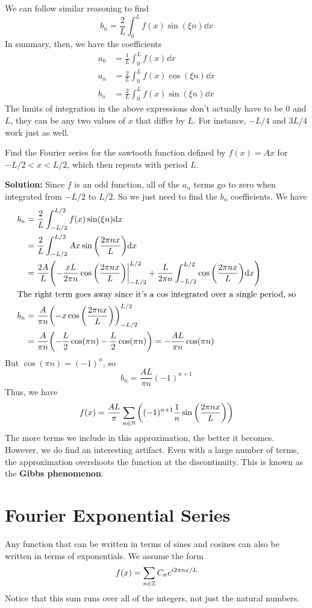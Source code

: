 We can follow similar reasoning to find
\[ b_n = \frac{2}{L}\int_0^L f(x)\sin(\xi n)\dd x\]
In summary, then, we have the coefficients
\begin{align*}
    a_0 &= \frac{1}{L}\int_0^L f(x)\dd x \\
    a_n &= \frac{2}{L}\int_0^L f(x)\cos(\xi n)\dd x \\
    b_n &= \frac{2}{L}\int_0^L f(x)\sin(\xi n)\dd x
\end{align*}
The limits of integration in the above expressions don't actually have to be $0$ and $L$, they can be any two values of $x$ that differ by $L$. For instance, $-L/4$ and $3L/4$ work just as well.  
\begin{example}
    Find the Fourier series for the sawtooth function defined by $f(x) = Ax$ for $-L/2 < x < L/2$, which then repeats with period $L$. 

    \textbf{Solution:} Since $f$ is an odd function, all of the $a_n$ terms go to zero when integrated from $-L/2$ to $L/2$. So we just need to find the $b_n$ coefficients. We have
    \begin{align*}
        b_n &= \frac{2}{L}\int_{-L/2}^{L/2} f(x)\sin(\xi n)\dd x \\
        &= \frac{2}{L}\int_{-L/2}^{L/2} Ax\sin\pqty{\frac{2\pi nx}{L}}\dd x \\
        &= \frac{2A}{L}\pqty{-\frac{xL}{2\pi n}\cos\pqty{\frac{2\pi nx}{L}}\biggr|_{-L/2}^{L/2} + \frac{L}{2\pi n}\int_{-L/2}^{L/2}\cos\pqty{\frac{2\pi nx}{L}}\dd x} \\
        \intertext{The right term goes away since it's a $\cos$ integrated over a single period, so}
        b_n &= \frac{A}{\pi n}\pqty{-x\cos\pqty{\frac{2\pi nx}{L}}}_{-L/2}^{L/2} \\
        &= \frac{A}{\pi n}\pqty{-\frac{L}{2}\cos(\pi n) - \frac{L}{2}\cos(\pi n)} = -\frac{AL}{\pi n}\cos(\pi n)
    \end{align*}
    But $\cos(\pi n) = (-1)^n$, so
    \[ b_n = \frac{AL}{\pi n}(-1)^{n+1}\]
    Thus, we have
    \[ f(x) = \frac{AL}{\pi}\sum_{n\in\N} \pqty{(-1)^{n+1}\frac{1}{n}\sin\pqty{\frac{2\pi nx}{L}}}\]
    The more terms we include in this approximation, the better it becomes. However, we do find an interesting artifact. Even with a large number of terms, the approximation overshoots the function at the discontinuity. This is known as the \textbf{Gibbs phenomenon}. 
\end{example}
\section{Fourier Exponential Series}
Any function that can be written in terms of sines and cosines can also be written in terms of exponentials. We assume the form
\[ f(x) = \sum_{n\in\mathbb{Z}}  C_n e^{i2\pi nx/L} \]
Notice that this sum runs over all of the integers, not just the natural numbers.

